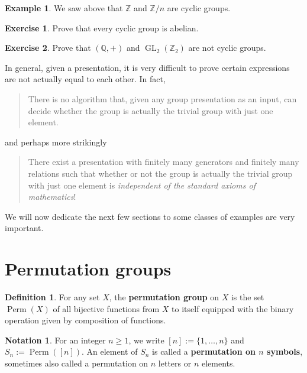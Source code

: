 \documentclass[12pt]{report}
\numberwithin{equation}{section}
\numberwithin{theorem}{chapter}
\theoremstyle{definition}
\newtheorem{definition}[theorem]{Definition}
\newtheorem{example}[theorem]{Example}
\newtheorem{exercise}{Exercise}
\newtheorem*{basic properties}{Basic Properties}
\newtheorem*{Important Remark}{Important Remark}
\newtheorem{notation}[theorem]{Notation}
\newcommand{\df}[1]{{\bf #1}\index{#1}}
\DeclareMathOperator{\Perm}{Perm}
\begin{document}
\begin{example}
	We saw above that $\mathbb{Z}$ and $\mathbb{Z}/n$ are cyclic groups.
\end{example}

\begin{exercise}
Prove that every cyclic group is abelian. 
\end{exercise}


\begin{exercise}
 Prove that $(\mathbb Q, +)$ and $\operatorname{GL}_2(\mathbb Z_2)$ are not cyclic groups.
\end{exercise}



In general, given a presentation, it is very difficult to prove certain expressions are not actually equal to each other. In fact,
\begin{quote}
There is no algorithm that, given any group presentation as an input, can decide whether the group is actually the trivial group with just one element.
\end{quote}
and perhaps more strikingly
\begin{quote}
There exist a presentation with finitely many generators and finitely many relations such that whether or not the group is actually the trivial group with just one element is {\em independent of the standard axioms of mathematics}!
\end{quote}










\vspace{2em}

We will now dedicate the next few sections to some classes of examples are very important.





\section{Permutation groups}


\begin{definition}
For any set $X$, the {\bf permutation group}  on $X$ is the set $\Perm(X)$ of all bijective functions from $X$ to itself equipped with the binary operation given by composition of functions.
\end{definition}

\begin{notation}\index{$[n]$}
For an integer $n \geqslant 1$, we write $[n] := \{1,\ldots,n\}$ and $S_n := \Perm([n])$. An element of $S_n$ is called a \df{permutation on $n$ symbols}, sometimes also called a permutation on $n$ letters or $n$ elements. 
\end{notation}
\end{document}

